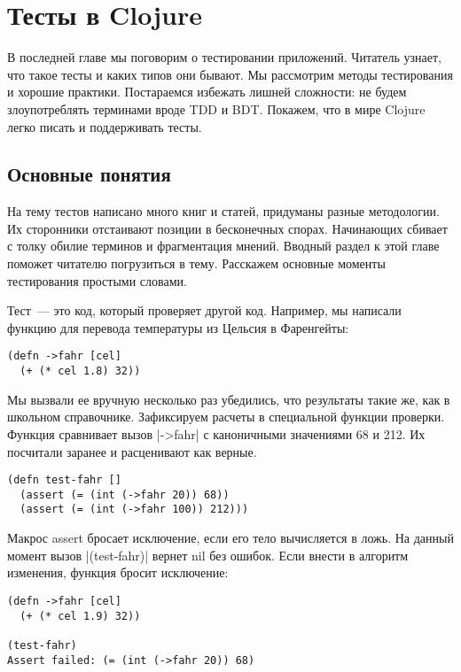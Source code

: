 \chapter{Тесты в Clojure}

\begin{teaser}
В последней главе мы поговорим о тестировании приложений. Читатель узнает, что
такое тесты и каких типов они бывают. Мы рассмотрим методы тестирования и
хорошие практики. Постараемся избежать лишней сложности: не будем злоупотреблять
терминами вроде TDD и BDT. Покажем, что в мире Clojure легко писать и
поддерживать тесты.
\end{teaser}

\section{Основные понятия}

На тему тестов написано много книг и статей, придуманы разные методологии. Их
сторонники отстаивают позиции в бесконечных спорах. Начинающих сбивает с толку
обилие терминов и фрагментация мнений. Вводный раздел к этой главе поможет
читателю погрузиться в тему. Расскажем основные моменты тестирования простыми
словами.

Тест~--- это код, который проверяет другой код. Например, мы написали функцию для
перевода температуры из Цельсия в Фаренгейты:

\begin{verbatim}
(defn ->fahr [cel]
  (+ (* cel 1.8) 32))
\end{verbatim}

Мы вызвали ее вручную несколько раз убедились, что результаты такие же, как в
школьном справочнике. Зафиксируем расчеты в специальной функции
проверки. Функция сравнивает вызов \spverb|->fahr| с каноничными значениями 68 и 212. Их
посчитали заранее и расценивают как верные.

\begin{verbatim}
(defn test-fahr []
  (assert (= (int (->fahr 20)) 68))
  (assert (= (int (->fahr 100)) 212)))
\end{verbatim}

Макрос assert бросает исключение, если его тело вычисляется в ложь. На данный
момент вызов \spverb|(test-fahr)| вернет nil без ошибок. Если внести в алгоритм
изменения, функция бросит исключение:

\begin{verbatim}
(defn ->fahr [cel]
  (+ (* cel 1.9) 32))

(test-fahr)
Assert failed: (= (int (->fahr 20)) 68)
\end{verbatim}

